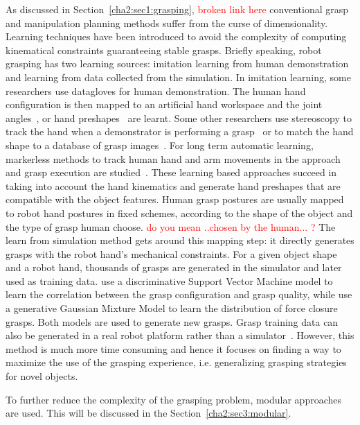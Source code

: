 As discussed in Section~\ref{cha2:sec1:grasping},
\textcolor{red}{broken link here}
conventional grasp and manipulation planning methods suffer from the curse of dimensionality.
Learning techniques have been introduced to avoid the complexity of computing kinematical constraints guaranteeing stable grasps. Briefly speaking, robot grasping has two learning sources: imitation learning from human demonstration and learning from data collected from the simulation.
In imitation learning, some researchers use datagloves for human demonstration. The human hand configuration is then mapped to an artificial hand workspace and the joint angles~\citep{Fischer1998,ekvall2007learning}, or hand preshapes~\citep{Kyota2005, pelossof2004svm, Li07} are learnt. Some other researchers use stereoscopy to track the hand when a demonstrator is performing a grasp~\citep{hueser2006learning} or to match the hand shape to a database of grasp images~\citep{Romero2008}. For long term automatic learning, markerless methods to track human hand and arm movements in the approach and grasp execution are studied~\citep{ekvall2007learning,do2009grasp}. These learning based approaches succeed in taking into account the hand kinematics and generate hand preshapes that are compatible with the object features. Human grasp postures are usually mapped to robot hand postures in fixed schemes, according to the shape of the object and the type of grasp human choose.
\textcolor{red}{do you mean ..chosen by the human... ?}
The learn from simulation method gets around this mapping step: it directly generates grasps with the robot hand's mechanical constraints. For a given object shape and a robot hand, thousands of grasps are generated in the simulator and later used as training data. \citet{pelossof2004svm} use a discriminative Support Vector Machine model to learn the correlation between the grasp configuration and grasp quality, while \citet{bidan2013grasp} use a generative Gaussian Mixture Model to learn the distribution of force closure grasps. Both models are used to generate new grasps. Grasp training data can also be generated in a real robot platform rather than a simulator~\citep{herzog2014learning}. However, this method is much more time consuming and hence it focuses on finding a way to maximize the use of the grasping experience, i.e. generalizing grasping strategies for novel objects.

To further reduce the complexity of the grasping problem, modular approaches are used. This will be discussed in the Section~\ref{cha2:sec3:modular}.

